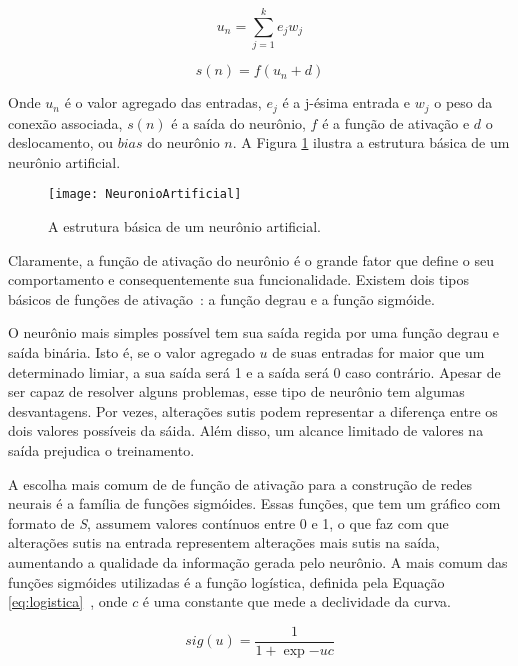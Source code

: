 \begin{equation}
 u_n = \sum_{j=1}^k e_jw_j
\end{equation}

\begin{equation}
s(n) = f(u_n + d)
\end{equation}

Onde $u_n$ é o valor agregado das entradas, $e_j$ é a j-ésima entrada e $w_j$ o peso da conexão associada, $s(n)$ é a saída do neurônio, $f$ é a função de ativação e $d$ o deslocamento, ou $bias$ do neurônio $n$. A Figura \ref{fig:neuroartificial} ilustra a estrutura básica de um neurônio artificial.

\begin{figure}
\centering
\texttt{[image: NeuronioArtificial]}
\caption{A estrutura básica de um neurônio artificial.}
\label{fig:neuroartificial}
\centering
\end{figure}

Claramente, a função de ativação do neurônio é o grande fator que define o seu comportamento e consequentemente sua funcionalidade. Existem dois tipos básicos de funções de ativação~\cite{Haykin}: a função degrau e a função sigmóide.

O neurônio mais simples possível tem sua saída regida por uma função degrau e saída binária. Isto é, se o valor agregado $u$ de suas entradas for maior que um determinado limiar, a sua saída será 1 e a saída será 0 caso contrário. Apesar de ser capaz de resolver alguns problemas, esse tipo de neurônio tem algumas desvantagens. Por vezes, alterações sutis podem representar a diferença entre os dois valores possíveis da sáida. Além disso, um alcance limitado de valores na saída prejudica o treinamento.

A escolha mais comum de de função de ativação para a construção de redes neurais é a família de funções sigmóides. Essas funções, que tem um gráfico com formato de \textit{S}, assumem valores contínuos entre 0 e 1, o que faz com que alterações sutis na entrada representem alterações mais sutis na saída, aumentando a qualidade da informação gerada pelo neurônio. A mais comum das funções sigmóides utilizadas é a função logística, definida pela Equação \ref{eq:logistica}~\cite{Kosabov}, onde $c$ é uma constante que mede a declividade da curva.

\begin{equation}
	sig(u) = \frac{1}{1 + \exp{-uc}}
\label{eq:logistica}
\end{equation}

